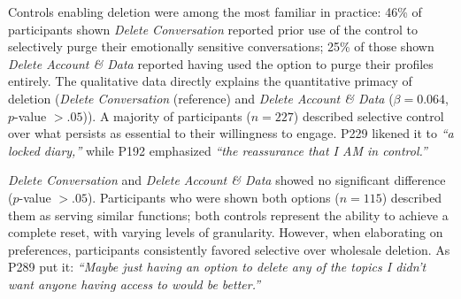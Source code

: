 \documentclass[letterpaper,twocolumn,10pt]{article}
\begin{document}
\begin{table}[htbp]
\centering
\def\arraystretch{1.2}
\caption{CLMM Results: Willingness to engage with GenAI Chatbots for Emotional Support}
\label{tab:willingness}
\end{table}

 Controls enabling deletion were among the most familiar in practice: 46\% of participants shown \emph{Delete Conversation} reported prior use of the control to selectively purge their emotionally sensitive conversations; 25\% of those shown \emph{Delete Account \& Data} reported having used the option to purge their profiles entirely. The qualitative data directly explains the quantitative primacy of deletion (\emph{Delete Conversation} (reference) and \emph{Delete Account \& Data} ($\beta = 0.064$, $p$-value $> .05$)). A majority of participants ($n=227$) described selective control over what persists as essential to their willingness to engage. P229 likened it to \textit{``a locked diary,''} while P192 emphasized \textit{``the reassurance that I AM in control.''}

\emph{Delete Conversation} and \emph{Delete Account \& Data} showed no significant difference ($p$-value $> .05$). Participants who were shown both options ($n=115$) described them as serving similar functions; both controls represent the ability to achieve a complete reset, with varying levels of granularity. However, when elaborating on preferences, participants consistently favored selective over wholesale deletion. As P289 put it: \textit{``Maybe just having an option to delete any of the topics I didn't want anyone having access to would be better.''}
\end{document}
